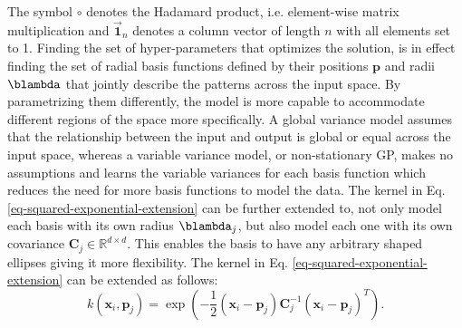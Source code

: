 \documentclass[useAMS,usenatbib,fleqn]{mn2e}
\begin{document}
The symbol $\circ$ denotes the Hadamard product, i.e. element-wise matrix multiplication and $\vec{\mathbf{1}}_{n}$ denotes a column vector of length $n$ with all elements set to 1. Finding the set of hyper-parameters that optimizes the solution, is in effect finding the set of radial basis functions defined by their positions $\mathbf{p}$ and radii $\blambda$ that jointly describe the patterns across the input space. By parametrizing them differently, the model is more capable to accommodate different regions of the space more specifically. A global variance model assumes that the relationship between the input and output is global or equal across the input space, whereas a variable variance model, or non-stationary GP, makes no assumptions and learns the variable variances for each basis function which reduces the need for more basis functions to model the data. The kernel in Eq. \eqref{eq-squared-exponential-extension} can be further extended to, not only model each basis with its own radius $\blambda_{j}$, but also model each one with its own covariance $\mathbf{C}_{j} \in \mathbb{R}^{d\times d}$. This enables the basis to have any arbitrary shaped ellipses giving it more flexibility. The kernel in Eq. \eqref{eq-squared-exponential-extension} can be extended as follows:
\begin{equation}
\label{eq-squared-exponential-covariance-extension}
k(\mathbf{x}_{i},\mathbf{p}_{j}) = \exp{\left(-\frac{1}{2}\left(\mathbf{x}_{i}-\mathbf{p}_{j}\right)\mathbf{C}_{j}^{-1}\left(\mathbf{x}_{i}-\mathbf{p}_{j}\right)^{T}\right)}.
\end{equation}
\end{document}
